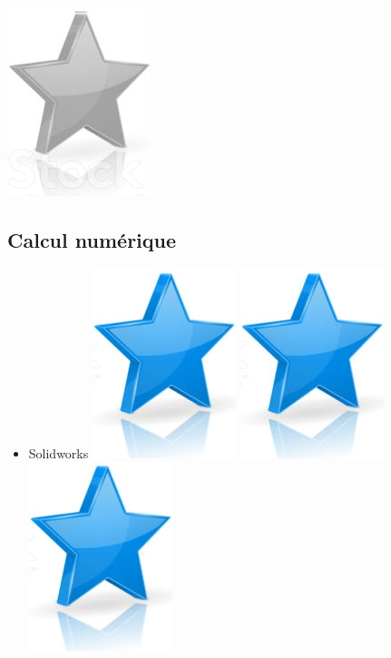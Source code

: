 \documentclass[10pt,a4paper,sans]{article}
\begin{document}
\begin{minipage}[t]{0.28\textwidth}
\begin{mdframed}[style=cadreCompetences]
\begin{itemize}
{                    \includegraphics[scale=0.20]{img/empty_star.png}}
        \end{itemize}

        \subsection{Calcul numérique}
            \begin{itemize}
                \item{Solidworks
                    \hfill
                    \includegraphics[scale=0.20]{img/star.png} \hspace{-0.2cm}
                    \includegraphics[scale=0.20]{img/star.png} \hspace{-0.2cm}
                    \includegraphics[scale=0.20]{img/star.png} \hspace{-0.2cm}
}
\end{itemize}
\end{mdframed}
\end{minipage}
\end{document}
